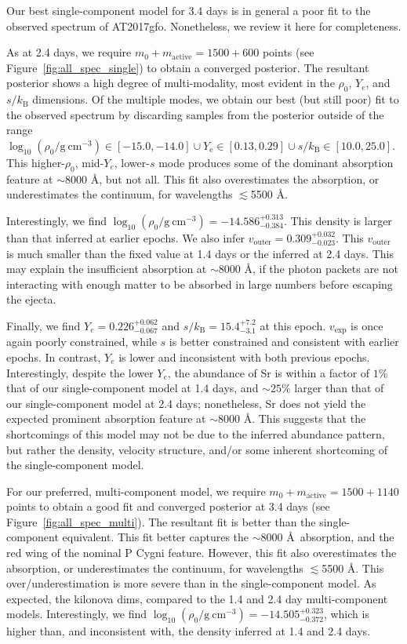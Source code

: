 \documentclass[twocolumn,twocolappendix]{aastex63}
\begin{document}
Our best single-component model for 3.4 days is in general a poor fit to the observed spectrum of AT2017gfo. Nonetheless, we review it here for completeness.

As at 2.4 days, we require $m_0 + m_{\mathrm{active}} = 1500 + 600$ points (see Figure~\ref{fig:all_spec_single}) to obtain a converged posterior. The resultant posterior shows a high degree of multi-modality, most evident in the $\rho_0$, $Y_e$, and $s / k_{\mathrm{B}}$ dimensions. Of the multiple modes, we obtain our best (but still poor) fit to the observed spectrum by discarding samples from the posterior outside of the range $\log_{10}(\rho_0 / \mathrm{g~cm^{-3}}) \in [-15.0, -14.0] \cup Y_{\mathrm{e}} \in [0.13, 0.29] \cup s/k_{\mathrm{B}} \in [10.0, 25.0]$. This higher-$\rho_0$, mid-$Y_e$, lower-$s$ mode produces some of the dominant absorption feature at $\sim$8000 \AA, but not all. This fit also overestimates the absorption, or underestimates the continuum, for wavelengths $\lesssim$5500 \AA. 

Interestingly, we find $\log_{10} (\rho_0 / \mathrm{g~cm^{-3}}) = -14.586^{+0.313}_{-0.384}$. This density is larger than that inferred at earlier epochs. We also infer $v_{\mathrm{outer}} = 0.309^{+0.032}_{-0.023}$. This $v_{\mathrm{outer}}$ is much smaller than the fixed value at 1.4 days or the inferred at 2.4 days. This may explain the insufficient absorption at $\sim8000$ \AA, if the photon packets are not interacting with enough matter to be absorbed in large numbers before escaping the ejecta.

Finally, we find $Y_e = 0.226^{+0.062}_{-0.067}$ and $s/k_{\mathrm{B}} = 15.4^{+7.2}_{-3.1}$ at this epoch. $v_{\mathrm{exp}}$ is once again poorly constrained, while $s$ is better constrained and consistent with earlier epochs. In contrast, $Y_e$ is lower and inconsistent with both previous epochs. Interestingly, despite the lower $Y_e$, the abundance of Sr is within a factor of $1$\% that of our single-component model at 1.4 days, and $\sim 25$\% larger than that of our single-component model at 2.4 days; nonetheless, Sr does not yield the expected prominent absorption feature at $\sim$8000 \AA. This suggests that the shortcomings of this model may not be due to the inferred abundance pattern, but rather the density, velocity structure, and/or some inherent shortcoming of the single-component model.

For our preferred, multi-component model, we require $m_0 + m_{\mathrm{active}} = 1500 + 1140$ points to obtain a good fit and converged posterior at 3.4 days (see Figure~\ref{fig:all_spec_multi}). The resultant fit is better than the single-component equivalent. This fit better captures the $\sim$8000 \AA~absorption, and the red wing of the nominal P Cygni feature. However, this fit also overestimates the absorption, or underestimates the continuum, for wavelengths $\lesssim$5500 \AA. This over/underestimation is more severe than in the single-component model. As expected, the kilonova dims, compared to the 1.4 and 2.4 day multi-component models. Interestingly, we find $\log_{10} (\rho_0 / \mathrm{g~cm^{-3}}) = -14.505^{+0.323}_{-0.372}$, which is higher than, and inconsistent with, the density inferred at 1.4 and 2.4 days. 
\end{document}

